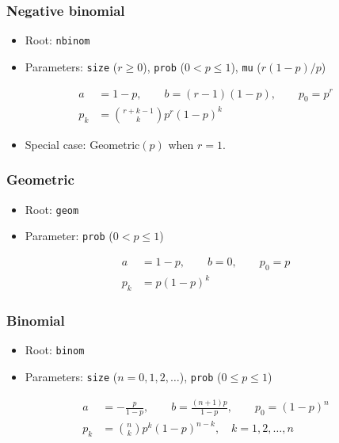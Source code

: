 \documentclass[x11names]{article}
\newcommand{\code}[1]{\texttt{#1}}
\begin{document}
\subsubsection{Negative binomial}

\begin{itemize}
\item Root: \code{nbinom}
\item Parameters: \code{size} ($r \geq 0$),
  \code{prob} ($0 < p \leq 1$),
  \code{mu} ($r(1 - p)/p$)
\end{itemize}
\begin{align*}
  a &= 1 - p, \qquad b = (r - 1)(1 - p), \qquad p_0 = p^r \\
  p_k &= \binom{r+k-1}{k} p^r (1 - p)^k
\end{align*}

\begin{itemize}
\item Special case: Geometric$(p)$ when $r = 1$.
\end{itemize}

\subsubsection{Geometric}

\begin{itemize}
\item Root: \code{geom}
\item Parameter: \code{prob} ($0 < p \leq 1$)
\end{itemize}
\begin{align*}
  a &= 1 - p, \qquad b = 0, \qquad p_0 = p \\
  p_k &= p (1 - p)^k
\end{align*}

\subsubsection{Binomial}

\begin{itemize}
\item Root: \code{binom}
\item Parameters: \code{size} ($n = 0, 1, 2, \dots$),
  \code{prob} ($0 \leq p \leq 1$)
\end{itemize}
\begin{align*}
  a &= -\frac{p}{1 - p}, \qquad b = \frac{(n + 1)p}{1 - p}, \qquad p_0 = (1 - p)^n \\
  p_k &= \binom{n}{k} p^k (1 - p)^{n - k}, \quad
        k = 1, 2, \dots, n
\end{align*}
\end{document}
